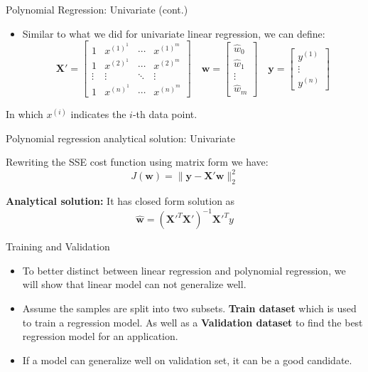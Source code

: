 \documentclass[serif, aspectratio=169]{beamer}
\begin{document}
\begin{frame}{Polynomial Regression: Univariate (cont.)}
    \begin{itemize}
        \item Similar to what we did for univariate linear regression, we can define:
        \[
        \mathbf{X'} =
        \begin{bmatrix}
        1 & x^{(1)^1} & \cdots & x^{(1)^m} \\
        1 & x^{(2)^1} & \cdots & x^{(2)^m} \\
        \vdots & \vdots & \ddots & \vdots \\
        1 & x^{(n)^1} & \cdots & x^{(n)^m}
        \end{bmatrix}
        \quad
        \mathbf{w} =
        \begin{bmatrix}
        \hat{w}_0 \\
        \hat{w}_1 \\
        \vdots \\
        \hat{w}_m
        \end{bmatrix}
        \quad
        \mathbf{y} =
        \begin{bmatrix}
        y^{(1)} \\
        \vdots \\
        y^{(n)}
        \end{bmatrix}
        \]
    \end{itemize}
    \begin{center}
        In which \( x^{(i)} \) indicates the \( i \)-th data point.
    \end{center}
\end{frame}

\begin{frame}{Polynomial regression analytical solution: Univariate}
    \item Rewriting the SSE cost function using matrix form we have:
    \[
    J(\mathbf{w}) = \| \mathbf{y} - \mathbf{X'} \mathbf{w} \|_2^2
    \]
    \item \textbf{Analytical solution:} It has closed form solution as $$ \hat{\mathbf{w}} = \left( \mathbf{X'}^T\mathbf{X'} \right)^{-1} \mathbf{X'}^T y $$
\end{frame}

\begin{frame}{Training and Validation}
    \begin{itemize}
        \item To better distinct between linear regression and polynomial regression, we will show that linear model can not generalize well.
        \item Assume the samples are split into two subsets. \textbf{Train dataset} which is used to train a regression model. As well as a \textbf{Validation dataset} to find the best regression model for an application.
        \item If a model can generalize well on validation set, it can be a good candidate.
    \end{itemize}
\end{frame}
\end{document}
